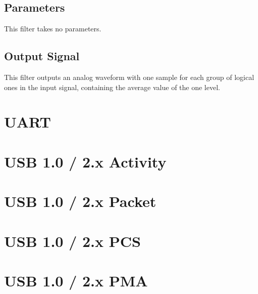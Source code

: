 \subsection{Parameters}

This filter takes no parameters.

\subsection{Output Signal}

This filter outputs an analog waveform with one sample for each group of logical ones in the input signal, containing
the average value of the one level.

\pagebreak
\section{UART}

\pagebreak
\section{USB 1.0 / 2.x Activity}

\pagebreak
\section{USB 1.0 / 2.x Packet}

\pagebreak
\section{USB 1.0 / 2.x PCS}

\pagebreak
\section{USB 1.0 / 2.x PMA}

\pagebreak
